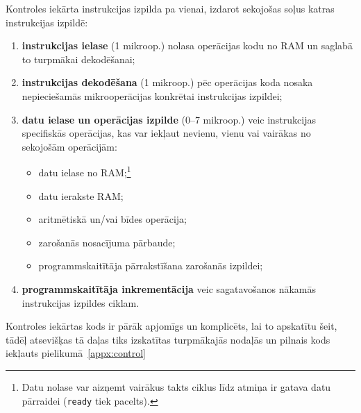 	Kontroles iekārta instrukcijas izpilda pa vienai, izdarot sekojošas
	soļus katras instrukcijas izpildē:
	\begin{enumerate}
		\item \textbf{instrukcijas ielase} (1 mikroop.) nolasa operācijas kodu no RAM
			un saglabā to turpmākai dekodēšanai;
		\item \textbf{instrukcijas dekodēšana} (1 mikroop.) pēc operācijas
			koda nosaka nepieciešamās mikrooperācijas konkrētai instrukcijas
			izpildei; %
		\item \textbf{datu ielase un operācijas izpilde} (0--7 mikroop.)
			veic instrukcijas specifiskās operācijas, kas var iekļaut
			nevienu, vienu vai vairākas no sekojošām operācijām:
			\begin{itemize}
				\item datu ielase no RAM;\footnote{%
					Datu nolase var aizņemt vairākus takts ciklus līdz
					atmiņa ir gatava datu pārraidei (\texttt{ready} tiek pacelts).}
				\item datu ierakste RAM;
				\item aritmētiskā un/vai bīdes operācija;
				\item zarošanās nosacījuma pārbaude;
				\item programmskaitītāja pārrakstīšana zarošanās izpildei;
			\end{itemize}\pagebreak[1]
		\item \textbf{programmskaitītāja inkrementācija} veic sagatavošanos
			nākamās instrukcijas izpildes ciklam.
	\end{enumerate}
	
	Kontroles iekārtas kods ir pārāk apjomīgs un komplicēts, lai to
	apskatītu šeit, tādēļ atsevišķas tā daļas tiks izskatītas turpmākajās
	nodaļās un pilnais kods iekļauts pielikumā~\ref{appx:control}
